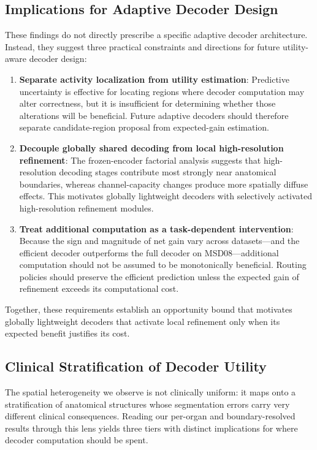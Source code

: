 \subsection{Implications for Adaptive Decoder Design}
These findings do not directly prescribe a specific adaptive decoder architecture. Instead, they suggest three practical constraints and directions for future utility-aware decoder design:
\begin{enumerate}
    \item \textbf{Separate activity localization from utility estimation}: Predictive uncertainty is effective for locating regions where decoder computation may alter correctness, but it is insufficient for determining whether those alterations will be beneficial. Future adaptive decoders should therefore separate candidate-region proposal from expected-gain estimation.
    \item \textbf{Decouple globally shared decoding from local high-resolution refinement}: The frozen-encoder factorial analysis suggests that high-resolution decoding stages contribute most strongly near anatomical boundaries, whereas channel-capacity changes produce more spatially diffuse effects. This motivates globally lightweight decoders with selectively activated high-resolution refinement modules.
    \item \textbf{Treat additional computation as a task-dependent intervention}: Because the sign and magnitude of net gain vary across datasets---and the efficient decoder outperforms the full decoder on MSD08---additional computation should not be assumed to be monotonically beneficial. Routing policies should preserve the efficient prediction unless the expected gain of refinement exceeds its computational cost.
\end{enumerate}

Together, these requirements establish an opportunity bound that motivates globally lightweight decoders that activate local refinement only when its expected benefit justifies its cost.

\subsection{Clinical Stratification of Decoder Utility}
\label{sec:clinical_stratification}
The spatial heterogeneity we observe is not clinically uniform: it maps onto a stratification of anatomical structures whose segmentation errors carry very different clinical consequences. Reading our per-organ and boundary-resolved results through this lens yields three tiers with distinct implications for where decoder computation should be spent.

